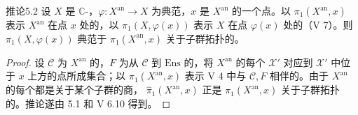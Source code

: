 \begin{SGAresult}{推论}{5.2}
设 $X$ 是 $\mathbb C$-，$\varphi:X^{\mathrm{an}}\to X$ 为典范，$x$ 是 $X^{\mathrm{an}}$ 的一个点。以 $\pi_1(X^{\mathrm{an}},x)$ 表示 $X^{\mathrm{an}}$ 在点 $x$ 处的，以 $\pi_1(X,\varphi(x))$ 表示 $X$ 在点 $\varphi(x)$ 处的（V 7）。则 $\pi_1(X,\varphi(x))$ 典范于 $\pi_1(X^{\mathrm{an}},x)$ 关于子群拓扑的。
\end{SGAresult}
\begin{proof}
设 $\mathcal C$ 为 $X^{\mathrm{an}}$ 的，$F$ 为从 $\mathcal C$ 到 $\mathrm{Ens}$ 的，将 $X^{\mathrm{an}}$ 的每个 $\mathcal X'$ 对应到 $\mathcal X'$ 中位于 $x$ 上方的点所成集合；以 $\widehat\pi_1(X^{\mathrm{an}},x)$ 表示 V 4 中与 $\mathcal C,F$ 相伴的。由于 $X^{\mathrm{an}}$ 的每个都是关于某个子群的商，
$\widehat\pi_1(X^{\mathrm{an}},x)$ 正是 $\pi_1(X^{\mathrm{an}},x)$ 关于子群拓扑的。推论遂由 5.1 和 V 6.10 得到。
\end{proof}

